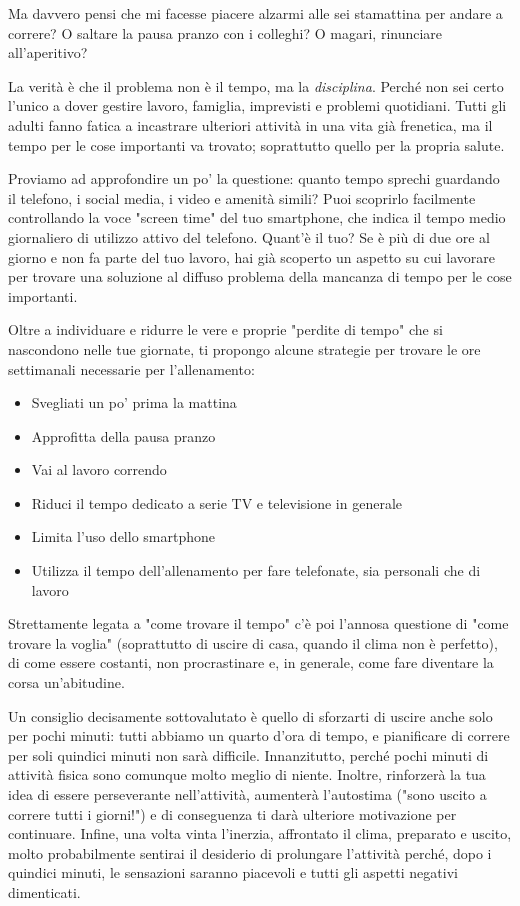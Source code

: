 Ma davvero pensi che mi facesse piacere alzarmi alle sei stamattina per andare a correre?
O saltare la pausa pranzo con i colleghi? O magari, rinunciare all’aperitivo?

La verità è che il problema non è il tempo, ma la \emph{disciplina}.
Perché non sei certo l'unico a dover gestire lavoro, famiglia,
imprevisti e problemi quotidiani.
Tutti gli adulti fanno fatica a 
incastrare ulteriori attività in una vita già frenetica,
ma il tempo per le cose importanti va trovato;
soprattutto quello per la propria salute.

Proviamo ad approfondire un po' la questione:
quanto tempo sprechi guardando il telefono,
i social media, i video e amenità simili?
Puoi scoprirlo facilmente controllando la voce
"screen time" del tuo smartphone,
che indica il tempo medio giornaliero di utilizzo attivo
del telefono. Quant'è il tuo?
Se è più di due ore al giorno e non fa parte del tuo lavoro,
hai già scoperto un aspetto su cui lavorare per trovare una soluzione
al diffuso problema della mancanza di tempo per le cose importanti.

Oltre a individuare e ridurre le vere e proprie
"perdite di tempo" che si nascondono nelle tue giornate,
ti propongo alcune strategie per trovare le ore 
settimanali necessarie per l'allenamento:

\begin{itemize}
    \item Svegliati un po' prima la mattina
    \item Approfitta della pausa pranzo
    \item Vai al lavoro correndo
    \item Riduci il tempo dedicato a serie TV e televisione in generale
    \item Limita l'uso dello smartphone
    \item Utilizza il tempo dell'allenamento per fare telefonate, sia personali che di lavoro
\end{itemize}

Strettamente legata a "come trovare il tempo"
c'è poi l'annosa questione di "come trovare la voglia"
(soprattutto di uscire di casa, quando il clima non è perfetto),
di come essere costanti, non procrastinare e,
in generale, come fare diventare la corsa un'abitudine.

Un consiglio decisamente sottovalutato è quello di sforzarti di
uscire anche solo per pochi minuti:
tutti abbiamo un quarto d'ora di tempo,
e pianificare di correre per soli quindici minuti non sarà difficile.
Innanzitutto, perché pochi minuti di attività fisica sono
comunque molto meglio di niente.
Inoltre, rinforzerà la tua idea di essere perseverante nell'attività,
aumenterà l'autostima ("sono uscito a correre tutti i giorni!")
e di conseguenza ti darà ulteriore motivazione per continuare.
Infine, una volta vinta l'inerzia, affrontato il clima, preparato e uscito,
molto probabilmente sentirai il desiderio di prolungare l'attività perché,
dopo i quindici minuti, le sensazioni saranno piacevoli e tutti gli aspetti
negativi dimenticati.

